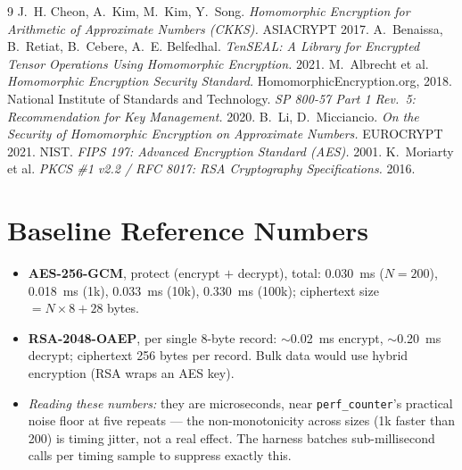 \documentclass[11pt,a4paper]{article}
\begin{document}
\begin{thebibliography}{9}
 J.~H. Cheon, A.~Kim, M.~Kim, Y.~Song.
  \emph{Homomorphic Encryption for Arithmetic of Approximate Numbers (CKKS).}
  ASIACRYPT 2017.
 A.~Benaissa, B.~Retiat, B.~Cebere, A.~E. Belfedhal.
  \emph{TenSEAL: A Library for Encrypted Tensor Operations Using Homomorphic
  Encryption.} 2021.
 M.~Albrecht et al.
  \emph{Homomorphic Encryption Security Standard.}
  HomomorphicEncryption.org, 2018.
 National Institute of Standards and Technology.
  \emph{SP 800-57 Part 1 Rev.\ 5: Recommendation for Key Management.} 2020.
 B.~Li, D.~Micciancio.
  \emph{On the Security of Homomorphic Encryption on Approximate Numbers.}
  EUROCRYPT 2021.
 NIST. \emph{FIPS 197: Advanced Encryption Standard (AES).} 2001.
 K.~Moriarty et al.
  \emph{PKCS \#1 v2.2 / RFC 8017: RSA Cryptography Specifications.} 2016.
\end{thebibliography}

\appendix
\section{Baseline Reference Numbers}

\begin{itemize}[leftmargin=1.4em,itemsep=1pt]
  \item \textbf{AES-256-GCM}, protect (encrypt $+$ decrypt), total:
    0.030~ms ($N=200$), 0.018~ms (1k), 0.033~ms (10k), 0.330~ms (100k);
    ciphertext size $= N\times8 + 28$ bytes.
  \item \textbf{RSA-2048-OAEP}, per single 8-byte record: $\sim$0.02~ms encrypt,
    $\sim$0.20~ms decrypt; ciphertext 256 bytes per record. Bulk data would use
    hybrid encryption (RSA wraps an AES key).
  \item \emph{Reading these numbers:} they are microseconds, near
    \texttt{perf\_counter}'s practical noise floor at five repeats --- the
    non-monotonicity across sizes (1k faster than 200) is timing jitter, not a
    real effect. The harness batches sub-millisecond calls per timing sample to
    suppress exactly this.
\end{itemize}
\end{document}
